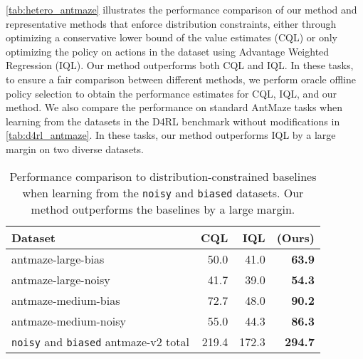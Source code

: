 \autoref{tab:hetero_antmaze} illustrates the performance comparison of our method and representative methods that enforce distribution constraints, either through optimizing a conservative lower bound of the value estimates (CQL) or only optimizing the policy on actions in the dataset using Advantage Weighted Regression \cite{peng2019awr} (IQL). Our method outperforms both CQL and IQL. In these tasks, to ensure a fair comparison between  different methods, we perform oracle offline policy selection to obtain the performance estimates for CQL, IQL, and our method. We also compare the performance on standard AntMaze tasks when learning from the datasets in the D4RL benchmark without modifications in \autoref{tab:d4rl_antmaze}. In these tasks, our method outperforms IQL by a large margin on two diverse datasets.
\begin{table}[!htp]\centering
\caption{Performance comparison to distribution-constrained baselines when learning from the \texttt{noisy} and \texttt{biased} datasets. Our method outperforms the baselines by a large margin.}\label{tab:hetero_antmaze}
\small
\begin{tabular}{l||rr|r}
Dataset & CQL & IQL & \name{} (Ours) \\ \hline

antmaze-large-bias & 50.0 & 41.0 & \textbf{ 63.9 } \\

antmaze-large-noisy  & 41.7 & 39.0 & \textbf{ 54.3 } \\

antmaze-medium-bias  & 72.7 & 48.0 & \textbf{ 90.2 } \\

antmaze-medium-noisy  & 55.0 & 44.3 & \textbf{ 86.3 } \\ \hline

\texttt{noisy} and \texttt{biased} antmaze-v2 total & 219.4 & 172.3 &  \textbf{294.7} \\ \hline
\end{tabular}
\end{table}
